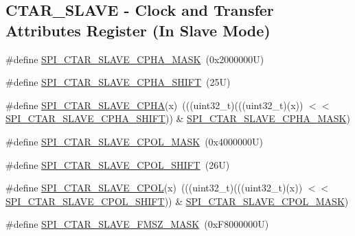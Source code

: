 \subsection*{C\+T\+A\+R\+\_\+\+S\+L\+A\+VE -\/ Clock and Transfer Attributes Register (In Slave Mode)}
\begin{DoxyCompactItemize}
\item 
\#define \mbox{\hyperlink{group___s_p_i___register___masks_ga3e8aa9f143abc35fcb9f86e5de378621}{S\+P\+I\+\_\+\+C\+T\+A\+R\+\_\+\+S\+L\+A\+V\+E\+\_\+\+C\+P\+H\+A\+\_\+\+M\+A\+SK}}~(0x2000000\+U)
\item 
\#define \mbox{\hyperlink{group___s_p_i___register___masks_ga6470631f0d2f0d7722ab55a1f97c936e}{S\+P\+I\+\_\+\+C\+T\+A\+R\+\_\+\+S\+L\+A\+V\+E\+\_\+\+C\+P\+H\+A\+\_\+\+S\+H\+I\+FT}}~(25\+U)
\item 
\#define \mbox{\hyperlink{group___s_p_i___register___masks_ga28951f37b39ab32bd77c07318b53e94f}{S\+P\+I\+\_\+\+C\+T\+A\+R\+\_\+\+S\+L\+A\+V\+E\+\_\+\+C\+P\+HA}}(x)~(((uint32\+\_\+t)(((uint32\+\_\+t)(x)) $<$$<$ \mbox{\hyperlink{group___s_p_i___register___masks_ga6470631f0d2f0d7722ab55a1f97c936e}{S\+P\+I\+\_\+\+C\+T\+A\+R\+\_\+\+S\+L\+A\+V\+E\+\_\+\+C\+P\+H\+A\+\_\+\+S\+H\+I\+FT}})) \& \mbox{\hyperlink{group___s_p_i___register___masks_ga3e8aa9f143abc35fcb9f86e5de378621}{S\+P\+I\+\_\+\+C\+T\+A\+R\+\_\+\+S\+L\+A\+V\+E\+\_\+\+C\+P\+H\+A\+\_\+\+M\+A\+SK}})
\item 
\#define \mbox{\hyperlink{group___s_p_i___register___masks_ga57c0bdc9ff5183b0e8da776a8d803ff1}{S\+P\+I\+\_\+\+C\+T\+A\+R\+\_\+\+S\+L\+A\+V\+E\+\_\+\+C\+P\+O\+L\+\_\+\+M\+A\+SK}}~(0x4000000\+U)
\item 
\#define \mbox{\hyperlink{group___s_p_i___register___masks_ga183134048ae879b82e3aa07b4a51d79d}{S\+P\+I\+\_\+\+C\+T\+A\+R\+\_\+\+S\+L\+A\+V\+E\+\_\+\+C\+P\+O\+L\+\_\+\+S\+H\+I\+FT}}~(26\+U)
\item 
\#define \mbox{\hyperlink{group___s_p_i___register___masks_ga56f54251b5751bd87f577f5a3144446e}{S\+P\+I\+\_\+\+C\+T\+A\+R\+\_\+\+S\+L\+A\+V\+E\+\_\+\+C\+P\+OL}}(x)~(((uint32\+\_\+t)(((uint32\+\_\+t)(x)) $<$$<$ \mbox{\hyperlink{group___s_p_i___register___masks_ga183134048ae879b82e3aa07b4a51d79d}{S\+P\+I\+\_\+\+C\+T\+A\+R\+\_\+\+S\+L\+A\+V\+E\+\_\+\+C\+P\+O\+L\+\_\+\+S\+H\+I\+FT}})) \& \mbox{\hyperlink{group___s_p_i___register___masks_ga57c0bdc9ff5183b0e8da776a8d803ff1}{S\+P\+I\+\_\+\+C\+T\+A\+R\+\_\+\+S\+L\+A\+V\+E\+\_\+\+C\+P\+O\+L\+\_\+\+M\+A\+SK}})
\item 
\#define \mbox{\hyperlink{group___s_p_i___register___masks_ga5230074b3809e2ef525e87fdca078717}{S\+P\+I\+\_\+\+C\+T\+A\+R\+\_\+\+S\+L\+A\+V\+E\+\_\+\+F\+M\+S\+Z\+\_\+\+M\+A\+SK}}~(0x\+F8000000\+U)

\end{DoxyCompactItemize}
